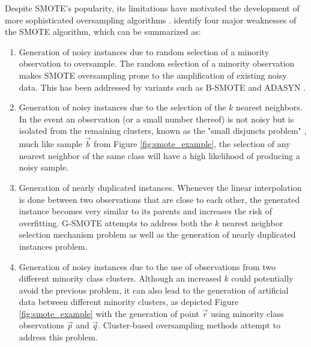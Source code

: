 \documentclass[parskip=full]{scrartcl}
\begin{document}
Despite SMOTE's popularity, its limitations have motivated the development of more
sophisticated oversampling algorithms \cite{Douzas2019, Han2005, Ma2017,
Douzas2017, Douzas2018, HaiboHe2008}. \cite{Douzas2019} identify four major
weaknesses of the SMOTE algorithm, which can be summarized as:
\begin{enumerate}
    \item Generation of noisy instances due to random selection of a minority
        observation to oversample. The random selection of a minority
        observation makes SMOTE oversampling prone to the amplification of
        existing noisy data. This has been addressed by variants such as B-SMOTE
        \cite{Han2005} and ADASYN \cite{HaiboHe2008}. 

    \item Generation of noisy instances due to the selection of the $k$ nearest
        neighbors. In the event an observation (or a small number thereof) is
        not noisy but is isolated from the remaining clusters, known as the
        "small disjuncts problem" \cite{holte1989}, much like sample
        $\overrightarrow{b}$ from Figure \ref{fig:smote_example}, the selection
        of any nearest neighbor of the same class will have a high likelihood of
        producing a noisy sample.

    \item Generation of nearly duplicated instances. Whenever the linear
        interpolation is done between two observations that are close to each
        other, the generated instance becomes very similar to its parents and
        increases the risk of overfitting. G-SMOTE \cite{Douzas2019} attempts to
        address both the $k$ nearest neighbor selection mechanism problem as
        well as the generation of nearly duplicated instances problem. 

    \item Generation of noisy instances due to the use of observations from two
        different minority class clusters. Although an increased $k$ could
        potentially avoid the previous problem, it can also lead to the
        generation of artificial data between different minority clusters, as
        depicted Figure \ref{fig:smote_example} with the generation of point
        $\overrightarrow{r}$ using minority class observations
        $\overrightarrow{p}$ and $\overrightarrow{q}$. Cluster-based
        oversampling methods attempt to address this problem. 
\end{enumerate}
\end{document}
